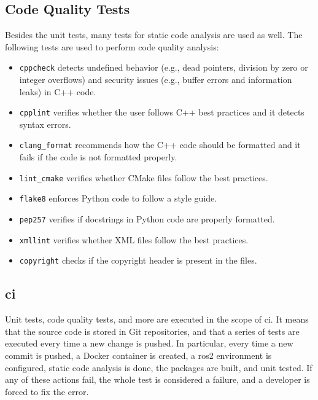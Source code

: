 \subsection{Code Quality Tests}
Besides the unit tests, many tests for static code analysis are used as well.
The following tests are used to perform code quality analysis:
\begin{itemize}
    \item \texttt{cppcheck} detects undefined behavior (e.g., dead pointers, division by zero or integer overflows) and security issues (e.g., buffer errors and information leaks) in C++ code.
    \item \texttt{cpplint} verifies whether the user follows C++ best practices and it detects syntax errors.
    \item \texttt{clang\_format} recommends how the C++ code should be formatted and it fails if the code is not formatted properly. 
    \item \texttt{lint\_cmake} verifies whether CMake files follow the best practices.
    \item \texttt{flake8} enforces Python code to follow a style guide.
    \item \texttt{pep257} verifies if docstrings in Python code are properly formatted.
    \item \texttt{xmllint} verifies whether XML files follow the best practices.
    \item \texttt{copyright} checks if the copyright header is present in the files.
\end{itemize}

\subsection{\acl{ci}}
Unit tests, code quality tests, and more are executed in the scope of \ac{ci}.
It means that the source code is stored in Git repositories, and that a series of tests are executed every time a new change is pushed.
In particular, every time a new commit is pushed, a Docker container is created, a \ac{ros2} environment is configured, static code analysis is done, the packages are built, and unit tested.
If any of these actions fail, the whole test is considered a failure, and a developer is forced to fix the error.
